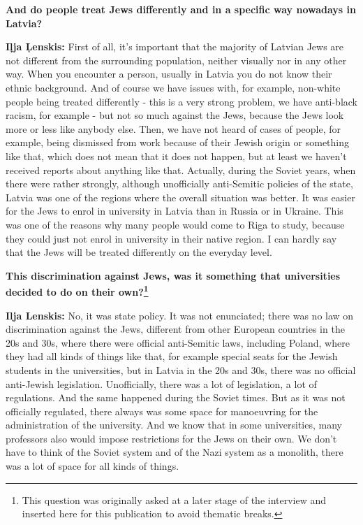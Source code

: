 \textbf{And do people treat Jews differently and in a specific way nowadays in Latvia?} 

\textbf{Iļja Ļenskis:} First of all, it's important that the majority of Latvian Jews are not different from the surrounding population, neither visually nor in any other way. When you encounter a person, usually in Latvia you do not know their ethnic background. And of course we have issues with, for example, non-white people being treated differently - this is a very strong problem, we have anti-black racism, for example - but not so much against the Jews, because the Jews look more or less like anybody else. Then, we have not heard of cases of people, for example, being dismissed from work because of their Jewish origin or something like that, which does not mean that it does not happen, but at least we haven't received reports about anything like that. Actually, during the Soviet years, when there were rather strongly, although unofficially anti-Semitic policies of the state, Latvia was one of the regions where the overall situation was better. It was easier for the Jews to enrol in university in Latvia than in Russia or in Ukraine. This was one of the reasons why many people would come to Riga to study, because they could just not enrol in university in their native region. I can hardly say that the Jews will be treated differently on the everyday level. 

\textbf{This discrimination against Jews, was it something that universities decided to do on their own?\footnote{This question was originally asked at a later stage of the interview and inserted here for this publication to avoid thematic breaks.}} 

\textbf{Ilja Lenskis:} No, it was state policy. 
It was not enunciated; there was no law on discrimination against the Jews, different from other European countries in the 20s and 30s, where there were official anti-Semitic laws, including Poland, where they had all kinds of things like that, for example special seats for the Jewish students in the universities, but in Latvia in the 20s and 30s, there was no official anti-Jewish legislation. Unofficially, there was a lot of legislation, a lot of regulations. And the same happened during the Soviet times. But as it was not officially regulated, there always was some space for manoeuvring for the administration of the university. And we know that in some universities, many professors also would impose restrictions for the Jews on their own. We don’t have to think of the Soviet system and of the Nazi system as a monolith, there was a lot of space for all kinds of things. 

